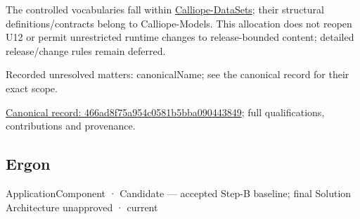 The controlled vocabularies fall within \hyperref[element:466ad8f75a954c0581b5bba090443849]{Calliope-DataSets};
their structural definitions/contracts belong to Calliope-Models. This allocation
does not reopen U12 or permit unrestricted runtime changes to release-bounded
content; detailed release/change rules remain deferred.


{\small Recorded unresolved matters: canonicalName; see the canonical record for their exact scope.}\par
{\footnotesize \href{../../../../continuum/application/application-component/466ad8f75a954c0581b5bba090443849.md}{Canonical record: 466ad8f75a954c0581b5bba090443849}; full qualifications, contributions and provenance.}\par
\subsection{Ergon}

\label{element:49c9eb2bef0c47b8b5328621d5fc5479}
{\small ApplicationComponent · Candidate — accepted Step-B baseline; final Solution Architecture unapproved · current}\par

